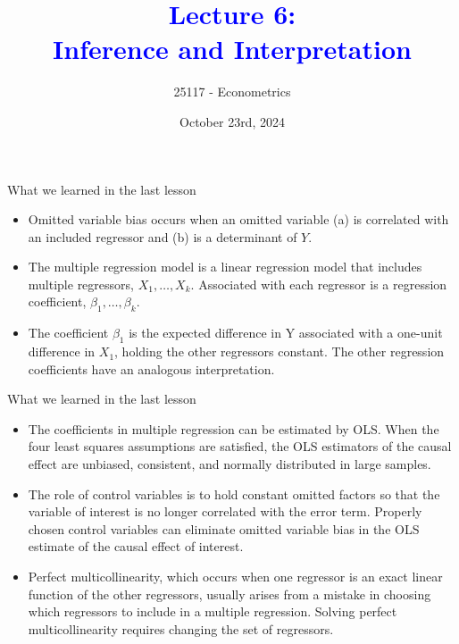 \documentclass[notes,10pt, aspectratio=169]{beamer}
\title[]{\textcolor{blue}{Lecture 6:\\Inference and Interpretation}}
\author{25117 - Econometrics}
\institute[shortinst]{Universitat Pompeu Fabra}
\date{October 23rd, 2024}
\begin{document}
\begin{frame}[plain]
\maketitle
\end{frame}


\begin{frame}{What we learned in the last lesson}
\begin{itemize}
    \item Omitted variable bias occurs when an omitted variable (a) is correlated with an included regressor and (b) is a determinant of $Y$.\\[1em]
    \item The multiple regression model is a linear regression model that includes multiple regressors, $X_1, \dots, X_k$. Associated with each regressor is a regression coefficient, $\beta_1, \dots, \beta_k$.\\[1em]
    \item The coefficient $\beta_1$ is the expected difference in Y associated with a one-unit difference in $X_1$, holding the other regressors constant. The other regression coefficients have an analogous interpretation.\\[1em]
\end{itemize}
\end{frame}

\begin{frame}{What we learned in the last lesson}
\begin{itemize}
    \item The coefficients in multiple regression can be estimated by OLS. When the four least squares assumptions are satisfied, the OLS estimators of the causal effect are unbiased, consistent, and normally distributed in large samples.\\[1em]
    \item The role of control variables is to hold constant omitted factors so that the variable of interest is no longer correlated with the error term. Properly chosen control variables can eliminate omitted variable bias in the OLS estimate of the causal effect of interest.\\[1em]
    \item Perfect multicollinearity, which occurs when one regressor is an exact linear function of the other regressors, usually arises from a mistake in choosing which regressors to include in a multiple regression. Solving perfect multicollinearity requires changing the set of regressors.
\end{itemize}
\end{frame}
\end{document}
